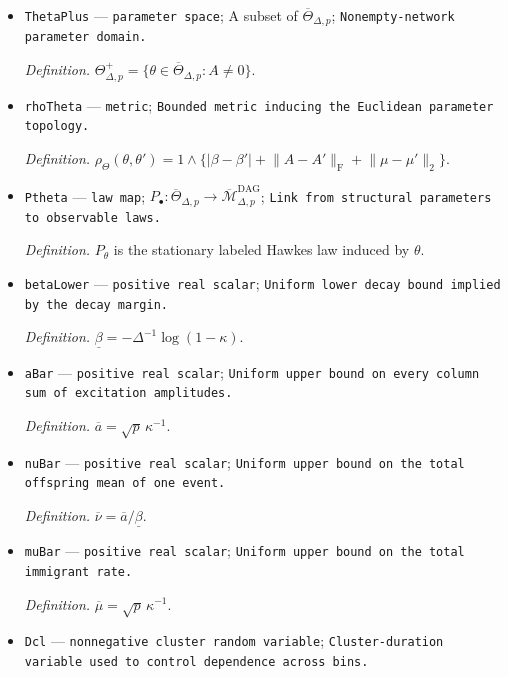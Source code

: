 \documentclass{article}
\begin{document}
\begin{itemize}
  \par\smallskip\noindent\emph{Definition.} \(\overline\Theta_{\Delta,p}\) is the structural parameter space inducing \(\overline{\mathcal M}_{\Delta,p}^{\mathrm{DAG}}\), defined in \(\text{def:parameter-law-topologies}\).
  \item \texttt{ThetaPlus} --- \texttt{parameter space}; A subset of \(\overline\Theta_{\Delta,p}\); \texttt{Nonempty-\allowbreak{}network parameter domain.}
  \par\smallskip\noindent\emph{Definition.} \(\Theta_{\Delta,p}^{+}=\{\theta\in\overline\Theta_{\Delta,p}:A\neq0\}\).
  \item \texttt{rhoTheta} --- \texttt{metric}; \texttt{Bounded metric inducing the Euclidean parameter topology.}
  \par\smallskip\noindent\emph{Definition.} \(\rho_{\Theta}(\theta,\theta')=1\wedge\{|\beta-\beta'|+\lVert A-A'\rVert_{\mathrm F}+\lVert\mu-\mu'\rVert_2\}\).
  \item \texttt{Ptheta} --- \texttt{law map}; \(P_{\bullet}:\overline\Theta_{\Delta,p}\to\overline{\mathcal M}_{\Delta,p}^{\mathrm{DAG}}\); \texttt{Link from structural parameters to observable laws.}
  \par\smallskip\noindent\emph{Definition.} \(P_{\theta}\) is the stationary labeled Hawkes law induced by \(\theta\).
  \item \texttt{betaLower} --- \texttt{positive real scalar}; \texttt{Uniform lower decay bound implied by the decay margin.}
  \par\smallskip\noindent\emph{Definition.} \(\underline\beta=-\Delta^{-1}\log(1-\kappa)\).
  \item \texttt{aBar} --- \texttt{positive real scalar}; \texttt{Uniform upper bound on every column sum of excitation amplitudes.}
  \par\smallskip\noindent\emph{Definition.} \(\overline a=\sqrt p\,\kappa^{-1}\).
  \item \texttt{nuBar} --- \texttt{positive real scalar}; \texttt{Uniform upper bound on the total offspring mean of one event.}
  \par\smallskip\noindent\emph{Definition.} \(\overline\nu=\overline a/\underline\beta\).
  \item \texttt{muBar} --- \texttt{positive real scalar}; \texttt{Uniform upper bound on the total immigrant rate.}
  \par\smallskip\noindent\emph{Definition.} \(\overline\mu=\sqrt p\,\kappa^{-1}\).
  \item \texttt{Dcl} --- \texttt{nonnegative cluster random variable}; \texttt{Cluster-\allowbreak{}duration variable used to control dependence across bins.}

\end{itemize}
\end{document}
